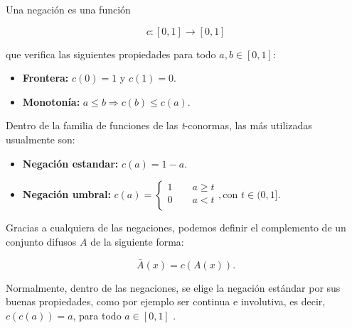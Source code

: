 Una negación es una función

\[
\ c: [0,1] \longrightarrow [0,1]
\]

que verifica las siguientes propiedades para todo $a,b \in [0,1]$:
\begin{itemize}
\item \textbf{Frontera:} $c(0) = 1$ y $c(1) = 0$.
\item \textbf{Monotonía:} $a \leq b \Rightarrow c(b) \leq c(a)$.
\end{itemize}

Dentro de la familia de funciones de las \textit{t}-conormas, las más utilizadas usualmente son:

\begin{itemize}
\item \textbf{Negación estandar:} $c(a)= 1-a$.
\item \textbf{Negación umbral:} $c(a)= \left\lbrace
  \begin{array}{l}
     1 \qquad a \geq t \\
     0 \qquad a < t \\
  \end{array}
  \right. , \textrm{con } t\in (0,1]$.
\end{itemize}

Gracias a cualquiera de las negaciones, podemos definir el complemento de un conjunto difusos $A$ de la siguiente forma:

\[
\ \bar{A}(x)= c(A(x)).
\]

Normalmente, dentro de las negaciones, se elige la negación estándar por sus buenas propiedades, como por ejemplo ser continua e involutiva, es decir, $c\left(c\left(a\right)\right)=a$, para todo $a \in [0,1]$ .


